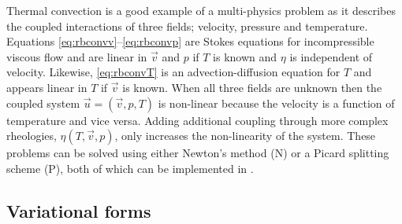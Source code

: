 Thermal convection is a good example of a multi-physics 
problem as it describes the coupled interactions of three fields;
velocity, pressure and temperature. Equations
\eqref{eq:rbconvv}--\eqref{eq:rbconvp} are  Stokes equations for incompressible viscous flow and are linear in $\vec{v}$ and $p$ if $T$ is
known and $\eta$ is independent of velocity.  Likewise,
\eqref{eq:rbconvT} is an advection-diffusion equation for $T$ and
appears linear in $T$ if $\vec{v}$ is known.   When all three fields are unknown then the coupled system $\vec{u}=\left(\vec{v}, p,
T\right)$ is non-linear because the velocity is a function of temperature and vice versa.  Adding additional coupling through more
complex rheologies, $\eta\left(T,\vec{v},p\right)$, only increases the
non-linearity of the system. These problems can be solved using either
Newton's method (N) or a Picard splitting scheme (P), both of which can
be implemented in \TF{}.


\subsection{Variational forms}

